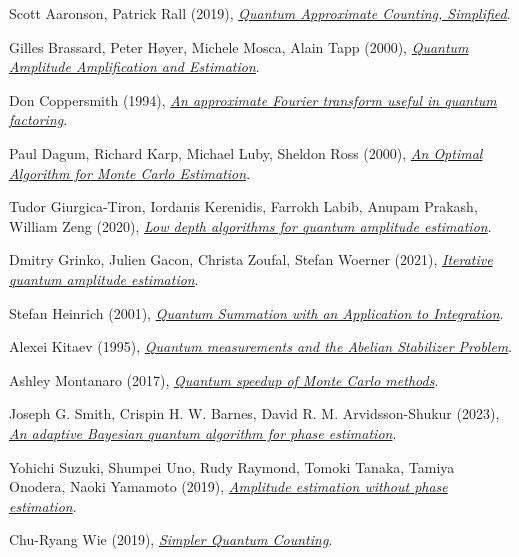 \documentclass[a4paper,onecolumn,11pt,unpublished]{quantumarticle}
\begin{document}

\begin{thebibliography}{99}
	
	Scott Aaronson, Patrick Rall (2019), \href{https://arxiv.org/abs/1908.10846}{\emph{Quantum Approximate Counting, Simplified}}.
	
	Gilles Brassard, Peter Høyer, Michele Mosca, Alain Tapp (2000), \href{https://arxiv.org/abs/quant-ph/0005055}{\emph{Quantum Amplitude Amplification and Estimation}}.
	
	Don Coppersmith (1994), \href{https://arxiv.org/abs/quant-ph/0201067}{\emph{An approximate Fourier transform useful in quantum factoring}}.
	
	Paul Dagum, Richard Karp, Michael Luby, Sheldon Ross (2000), \href{https://doi.org/10.1137/S0097539797315306}{\emph{An Optimal Algorithm for Monte Carlo Estimation}}.
	
	Tudor Giurgica-Tiron, Iordanis Kerenidis, Farrokh Labib, Anupam Prakash, William Zeng (2020), \href{https://arxiv.org/abs/2012.03348}{\emph{Low depth algorithms for quantum amplitude estimation}}.
	
	Dmitry Grinko, Julien Gacon, Christa Zoufal, Stefan Woerner (2021), \href{https://www.nature.com/articles/s41534-021-00379-1}{\emph{Iterative quantum amplitude estimation}}.
	
	Stefan Heinrich (2001), \href{https://arxiv.org/pdf/quant-ph/0105116.pdf}{\emph{Quantum Summation with an Application to Integration}}.
	
	Alexei Kitaev (1995), \href{https://arxiv.org/abs/quant-ph/9511026}{\emph{Quantum measurements and the Abelian Stabilizer Problem}}.
	
	Ashley Montanaro (2017), \href{https://arxiv.org/pdf/1504.06987.pdf}{\emph{Quantum speedup of Monte Carlo methods}}.
	
	Joseph G. Smith, Crispin H. W. Barnes, David R. M. Arvidsson-Shukur (2023), \href{https://arxiv.org/pdf/2303.01517.pdf}{\emph{An adaptive Bayesian quantum algorithm for phase estimation}}.
	
	Yohichi Suzuki, Shumpei Uno, Rudy Raymond, Tomoki Tanaka, Tamiya Onodera, Naoki Yamamoto (2019), \href{https://link.springer.com/article/10.1007/s11128-019-2565-2}{\emph{Amplitude estimation without phase estimation}}.
	
	Chu-Ryang Wie (2019), \href{https://arxiv.org/abs/1907.08119}{\emph{Simpler Quantum Counting}}.
	
\end{thebibliography}


\appendix


\end{document}
